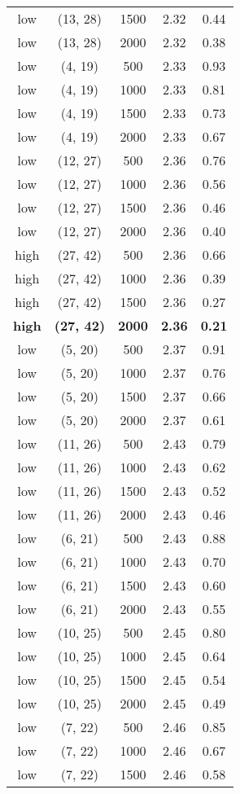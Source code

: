\begin{tabular}{c c c c c}
low & (13, 28) &  1500 & 2.32 & 0.44 \\
low & (13, 28) &  2000 & 2.32 & 0.38 \\
low & (4, 19) &  500 & 2.33 & 0.93 \\
low & (4, 19) &  1000 & 2.33 & 0.81 \\
low & (4, 19) &  1500 & 2.33 & 0.73 \\
low & (4, 19) &  2000 & 2.33 & 0.67 \\
low & (12, 27) &  500 & 2.36 & 0.76 \\
low & (12, 27) &  1000 & 2.36 & 0.56 \\
low & (12, 27) &  1500 & 2.36 & 0.46 \\
low & (12, 27) &  2000 & 2.36 & 0.40 \\
high & (27, 42) &  500 & 2.36 & 0.66 \\
high & (27, 42) &  1000 & 2.36 & 0.39 \\
high & (27, 42) &  1500 & 2.36 & 0.27 \\
\textbf{high} & \textbf{(27, 42)} & \textbf{ 2000} & \textbf{2.36} & \textbf{0.21} \\
low & (5, 20) &  500 & 2.37 & 0.91 \\
low & (5, 20) &  1000 & 2.37 & 0.76 \\
low & (5, 20) &  1500 & 2.37 & 0.66 \\
low & (5, 20) &  2000 & 2.37 & 0.61 \\
low & (11, 26) &  500 & 2.43 & 0.79 \\
low & (11, 26) &  1000 & 2.43 & 0.62 \\
low & (11, 26) &  1500 & 2.43 & 0.52 \\
low & (11, 26) &  2000 & 2.43 & 0.46 \\
low & (6, 21) &  500 & 2.43 & 0.88 \\
low & (6, 21) &  1000 & 2.43 & 0.70 \\
low & (6, 21) &  1500 & 2.43 & 0.60 \\
low & (6, 21) &  2000 & 2.43 & 0.55 \\
low & (10, 25) &  500 & 2.45 & 0.80 \\
low & (10, 25) &  1000 & 2.45 & 0.64 \\
low & (10, 25) &  1500 & 2.45 & 0.54 \\
low & (10, 25) &  2000 & 2.45 & 0.49 \\
low & (7, 22) &  500 & 2.46 & 0.85 \\
low & (7, 22) &  1000 & 2.46 & 0.67 \\
low & (7, 22) &  1500 & 2.46 & 0.58 \\

\end{tabular}

